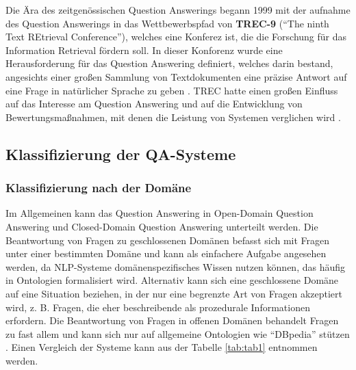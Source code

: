 \documentclass[
        ngerman,
        paper=a4,
        numbers=noendperiod,
]{scrreprt}
\begin{document}
Die Ära des zeitgenössischen Question Answerings begann 1999 mit der aufnahme des Question Answerings in das Wettbewerbspfad von \textbf{TREC-9} (\enquote{The ninth Text REtrieval Conference}), welches eine  Konferez ist, die die Forschung für das Information Retrieval fördern soll. In dieser Konforenz wurde eine Herausforderung für das Question Answering definiert, welches darin bestand, angesichts einer großen Sammlung von Textdokumenten eine präzise Antwort auf eine Frage in natürlicher Sprache zu geben \citep{VoorheesReportTREC-9}. TREC hatte einen großen Einfluss auf das Interesse am Question Answering und auf die Entwicklung von Bewertungsmaßnahmen, mit denen die Leistung von Systemen verglichen wird \citep{voorhees2005trec}. 


\subsection{Klassifizierung der QA-Systeme}
\subsubsection{Klassifizierung nach der Domäne}
Im Allgemeinen kann das Question Answering in Open-Domain Question Answering und Closed-Domain Question Answering unterteilt werden. Die Beantwortung von Fragen zu geschlossenen Domänen befasst sich mit Fragen unter einer bestimmten Domäne und kann als einfachere Aufgabe angesehen werden, da NLP-Systeme domänenspezifisches Wissen nutzen können, das häufig in Ontologien formalisiert wird. Alternativ kann sich eine geschlossene Domäne auf eine Situation beziehen, in der nur eine begrenzte Art von Fragen akzeptiert wird, z. B. Fragen, die eher beschreibende als prozedurale Informationen erfordern. Die Beantwortung von Fragen in offenen Domänen behandelt Fragen zu fast allem und kann sich nur auf allgemeine Ontologien wie \enquote{DBpedia} stützen \citep{Mervin2013AnSystem}. Einen Vergleich der Systeme kann aus der Tabelle \ref{tab:tab1} entnommen werden.
\end{document}
